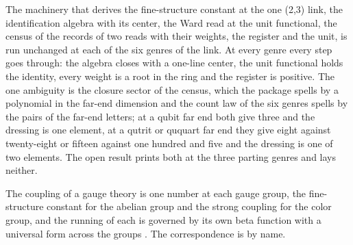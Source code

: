 The machinery that derives the fine-structure constant at the one (2,3) link, the identification algebra with its center, the Ward read at the unit functional, the census of the records of two reads with their weights, the register and the unit, is run unchanged at each of the six genres of the link. At every genre every step goes through: the algebra closes with a one-line center, the unit functional holds the identity, every weight is a root in the ring and the register is positive. The one ambiguity is the closure sector of the census, which the package spells by a polynomial in the far-end dimension and the count law of the six genres spells by the pairs of the far-end letters; at a qubit far end both give three and the dressing is one element, at a qutrit or ququart far end they give eight against twenty-eight or fifteen against one hundred and five and the dressing is one of two elements. The open result prints both at the three parting genres and lays neither.
\begin{chbridge}
The coupling of a gauge theory is one number at each gauge group, the fine-structure constant for the abelian group and the strong coupling for the color group, and the running of each is governed by its own beta function with a universal form across the groups \cite{Peskin1995,Gross1973}. The correspondence is by name.
\end{chbridge}
